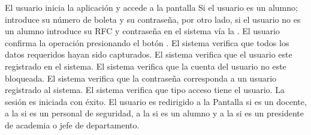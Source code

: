 \begin{UCtrayectoria}
\UCpaso[\UCactor] El usuario inicia la aplicación y accede a la pantalla 
\UCpaso[\UCactor] Si el usuario es un alumno; introduce su número de boleta y su contraseña, por otro lado, si el usuario no es un alumno introduce su RFC y contraseña en el sistema vía la \label{CU01.introduceDatos}.
\UCpaso[\UCactor] El usuario confirma la operación presionando el botón .
\UCpaso El sistema verifica que todos los datos requeridos hayan sido capturados.
\UCpaso El sistema verifica que el usuario este registrado en el sistema.
\UCpaso El sistema verifica que la cuenta del usuario no este bloqueada.
\UCpaso El sistema verifica que la contraseña corresponda a un usuario registrado al sistema.
\UCpaso El sistema verifica que tipo acceso tiene el usuario.
\UCpaso La sesión es iniciada con éxito.
\UCpaso El usuario es redirigido a la {Pantalla  si es un docente, a la  si es un personal de seguridad, a la  si es un alumno y a la  si es un presidente de academia o jefe de departamento}.
\end{UCtrayectoria}




